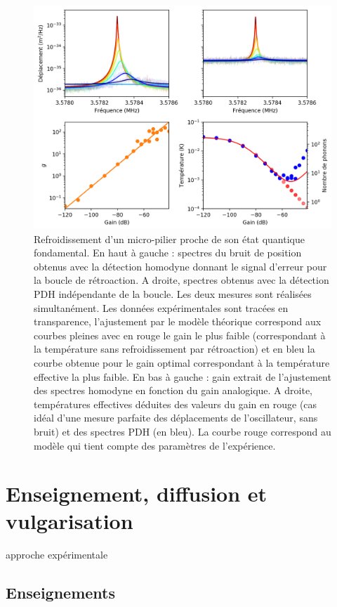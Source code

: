 \documentclass[12pt,a4paper]{article}
\begin{document}
\begin{figure}
\center
\includegraphics[scale=0.75]{figures/feedback_cooling_6phonons_defense_with_gain_all.png}
\caption{Refroidissement d'un micro-pilier proche de son état quantique fondamental.
En haut à gauche : spectres du bruit de position obtenus avec la détection homodyne donnant le signal d'erreur pour la boucle de rétroaction.
A droite, spectres obtenus avec la détection PDH indépendante de la boucle.
Les deux mesures sont réalisées simultanément.
Les données expérimentales sont tracées en transparence, l'ajustement par le modèle théorique correspond aux courbes pleines avec en rouge le gain le plus faible (correspondant à la température sans refroidissement par rétroaction) et en bleu la courbe obtenue pour le gain optimal correspondant à la température effective la plus faible.
En bas à gauche : gain extrait de l'ajustement des spectres homodyne en fonction du gain analogique.
A droite, températures effectives déduites des valeurs du gain en rouge (cas idéal d'une mesure parfaite des déplacements de l'oscillateur, sans bruit) et des spectres PDH (en bleu).
La courbe rouge correspond au modèle qui tient compte des paramètres de l'expérience.}
\label{fig:feedback_cooling_pillar}
\end{figure}

\section{Enseignement, diffusion et vulgarisation}

approche expérimentale

\subsection{Enseignements}
\end{document}
